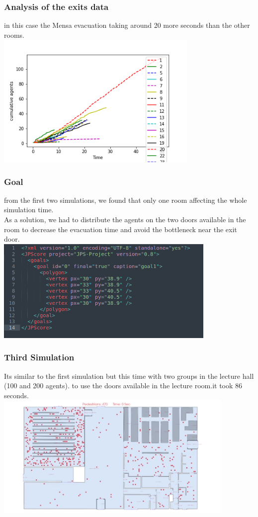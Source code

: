 \documentclass{beamer}
\begin{document}
\begin{frame}
\frametitle{Analysis of the exits data}
\raggedright
in this case the Mensa evacuation taking around 20 more seconds than the other rooms. \\

\centering
\includegraphics[height=6.5cm]{results_without_lecture_02.png}
\end{frame}

\begin{frame}
\frametitle{Goal}
\raggedright
from the first two simulations, we found that only one room affecting the whole simulation time. \\
As a solution, we had to distribute the agents on the two doors available in the room to decrease the evacuation time and avoid the bottleneck near the exit door. \\
\centering
\includegraphics[height=5cm]{goal.png}
\end{frame}

\begin{frame}
\frametitle{Third Simulation}
\raggedright
Its similar to the first simulation but this time with two groups in the lecture hall (100 and 200 agents). to use the doors available in the lecture room.it took 86 seconds.
\\
\centering
 \includegraphics[height=6cm]{01_simulation_start.png}
\end{frame}
\end{document}
